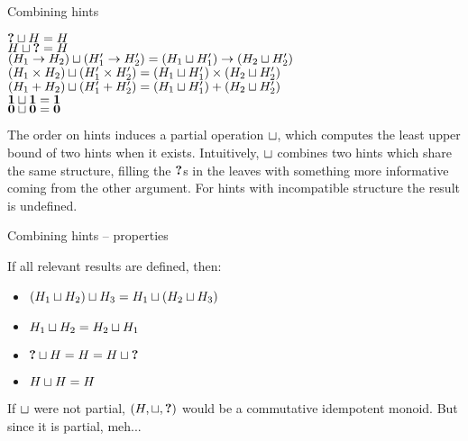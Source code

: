 \documentclass{beamer}
\newcommand{\Fun}[2]{#1 \to #2}
\newcommand{\Prod}[2]{#1 \times #2}
\newcommand{\Sum}[2]{#1 + #2}
\newcommand{\Unit}{\textbf{1}}
\newcommand{\Empty}{\textbf{0}}
\begin{document}
\begin{frame}{Combining hints}

\begin{center}
  $\textbf{?} \sqcup H = H$ \\
  $H \sqcup \textbf{?} = H$ \\
  $\combinehints{(\Fun{H_1}{H_2})}{(\Fun{H'_1}{H'_2})} = \Fun{(\combinehints{H_1}{H'_1})}{(\combinehints{H_2}{H'_2})}$ \\
  $\combinehints{(\Prod{H_1}{H_2})}{(\Prod{H'_1}{H'_2})} = \Prod{(\combinehints{H_1}{H'_1})}{(\combinehints{H_2}{H'_2})}$ \\
  $\combinehints{(\Sum{H_1}{H_2})}{(\Sum{H'_1}{H'_2})} = \Sum{(\combinehints{H_1}{H'_1})}{(\combinehints{H_2}{H'_2})}$ \\
  $\combinehints{\Unit}{\Unit} = \Unit$ \\
  $\combinehints{\Empty}{\Empty} = \Empty$
\end{center}

The order on hints induces a partial operation $\sqcup$, which computes the least upper bound of two hints when it exists. Intuitively, $\sqcup$ combines two hints which share the same structure, filling the $\textbf{?}$s in the leaves with something more informative coming from the other argument. For hints with incompatible structure the result is undefined.

\end{frame}

\begin{frame}{Combining hints -- properties}

If all relevant results are defined, then:

\begin{itemize}
  \item $(H_1 \sqcup H_2) \sqcup H_3 = H_1 \sqcup (H_2 \sqcup H_3)$
  \item $H_1 \sqcup H_2 = H_2 \sqcup H_1$
  \item $\textbf{?} \sqcup H = H = H \sqcup \textbf{?}$
  \item $H \sqcup H = H$
\end{itemize}

\vspace{2em}

If $\sqcup$ were not partial, $(H, \sqcup, \textbf{?})$ would be a commutative idempotent monoid. But since it is partial, meh...

\end{frame}
\end{document}
